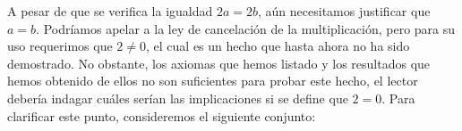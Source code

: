 \documentclass[11pt]{article}
\newcommand{\R}{\mathbb{R}}
\begin{document}
A pesar de que se verifica la igualdad $2a=2b$, aún necesitamos justificar que $a=b$. Podríamos apelar a la ley de cancelación de la multiplicación, pero para su uso requerimos que $2\neq 0$, el cual es un hecho que hasta ahora no ha sido demostrado. No obstante, los axiomas que hemos listado y los resultados que hemos obtenido de ellos no son suficientes para probar este hecho, el lector debería indagar cuáles serían las implicaciones si se define que $2=0$. Para clarificar este punto, consideremos el siguiente conjunto: %
%
\end{document}
